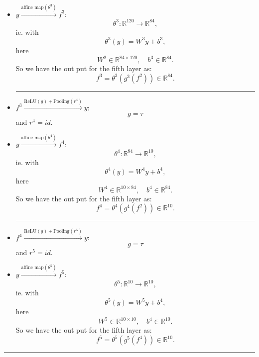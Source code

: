 \begin{itemize}
	\item $y \xrightarrow{\text{affine map}(\theta^3)} f^3$: 
	\begin{equation}
	\theta^3: \mathbb R^{120} \to \mathbb R^{84},
	\end{equation}
	ie.
	with 
	\begin{equation}
	\theta^3(y) = W^3 y + b^3,
	\end{equation}
	here 
	\begin{equation}
	W^2 \in \mathbb{R}^{84\times 120}, \quad b^3 \in \mathbb{R}^{84}.
	\end{equation}
	So we have the out put for the fifth layer as:
	\begin{equation}
	f^3 = \theta^3(g^3(f^2)) \in \mathbb{R}^{84}.
	\end{equation}
	
	
	\bigskip \hrule \bigskip
	\item $f^3 \xrightarrow{\text{ReLU}(g) + \text{Pooling}(r^4)} y$: 
	\begin{equation}
	g = \tau 
	\end{equation}
	and $r^4 = id$.
	
	\item $y \xrightarrow{\text{affine map}(\theta^4)} f^4$: 
	\begin{equation}
	\theta^4: \mathbb R^{84} \to \mathbb R^{10},
	\end{equation}
	ie.
	with 
	\begin{equation}
	\theta^4(y) = W^4 y + b^4,
	\end{equation}
	here 
	\begin{equation}
	W^4 \in \mathbb{R}^{10\times 84}, \quad b^4 \in \mathbb{R}^{84}.
	\end{equation}
	So we have the out put for the fifth layer as:
	\begin{equation}
	f^4 = \theta^4(g^4(f^2)) \in \mathbb{R}^{10}.
	\end{equation}
	
	\bigskip \hrule \bigskip
	\item $f^4 \xrightarrow{\text{ReLU}(g) + \text{Pooling}(r^5)} y$: 
	\begin{equation}
	g = \tau 
	\end{equation}
	and $r^5 = id$.
	
	\item $y \xrightarrow{\text{affine map}(\theta^5)} f^5$: 
	\begin{equation}
	\theta^5: \mathbb R^{10} \to \mathbb R^{10},
	\end{equation}
	ie.
	with 
	\begin{equation}
	\theta^5(y) = W^5 y + b^4,
	\end{equation}
	here 
	\begin{equation}
	W^5 \in \mathbb{R}^{10\times 10}, \quad b^4 \in \mathbb{R}^{10}.
	\end{equation}
	So we have the out put for the fifth layer as:
	\begin{equation}
	f^5 = \theta^5(g^5(f^4)) \in \mathbb{R}^{10}.
	\end{equation}
\end{itemize}
\bigskip \hrule \bigskip

